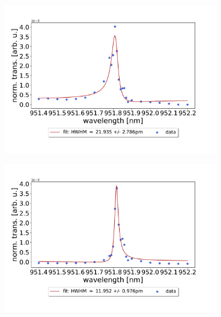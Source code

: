 \begin{figure}[h!]
    \centering
    \begin{subfigure}[b]{0.49\textwidth}
        \centering
        \includegraphics[width=\textwidth]{figures/60um_M5_fit_1.pdf}
        \caption{}
        \label{fig:short_single_fano_trans}
    \end{subfigure}
    \begin{subfigure}[b]{0.49\textwidth}
        \centering
        \includegraphics[width=\textwidth]{figures/220um_M5_fit_4.pdf}
        \caption{}
        \label{fig:long_single_fano_trans}
    \end{subfigure}
\end{figure}

